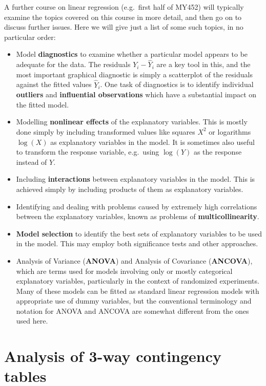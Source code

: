 \documentclass[11pt,a4paper,openany]{book}
\begin{document}
A further course on linear regression (e.g.~first half of MY452) will
typically examine the topics covered on this course in more detail, and
then go on to discuss further issues. Here we will give just a list of
some such topics, in no particular order:

\begin{itemize}
\item
  Model \textbf{diagnostics} to examine whether a particular model
  appears to be adequate for the data. The residuals
  \(Y_{i}-\hat{Y}_{i}\) are a key tool in this, and the most important
  graphical diagnostic is simply a scatterplot of the residuals against
  the fitted values \(\hat{Y}_{i}\). One task of diagnostics is to
  identify individual \textbf{outliers} and \textbf{influential
  observations} which have a substantial impact on the fitted model.
\item
  Modelling \textbf{nonlinear effects} of the explanatory variables.
  This is mostly done simply by including transformed values like
  squares \(X^{2}\) or logarithms \(\log(X)\) as explanatory variables
  in the model. It is sometimes also useful to transform the response
  variable, e.g.~using \(\log(Y)\) as the response instead of \(Y\).
\item
  Including \textbf{interactions} between explanatory variables in the
  model. This is achieved simply by including products of them as
  explanatory variables.
\item
  Identifying and dealing with problems caused by extremely high
  correlations between the explanatory variables, known as problems of
  \textbf{multicollinearity}.
\item
  \textbf{Model selection} to identify the best sets of explanatory
  variables to be used in the model. This may employ both significance
  tests and other approaches.
\item
  Analysis of Variance (\textbf{ANOVA}) and Analysis of Covariance
  (\textbf{ANCOVA}), which are terms used for models involving only or
  mostly categorical explanatory variables, particularly in the context
  of randomized experiments. Many of these models can be fitted as
  standard linear regression models with appropriate use of dummy
  variables, but the conventional terminology and notation for ANOVA and
  ANCOVA are somewhat different from the ones used here.
\end{itemize}

\chapter{Analysis of 3-way contingency tables}\label{c-3waytables}
\end{document}
